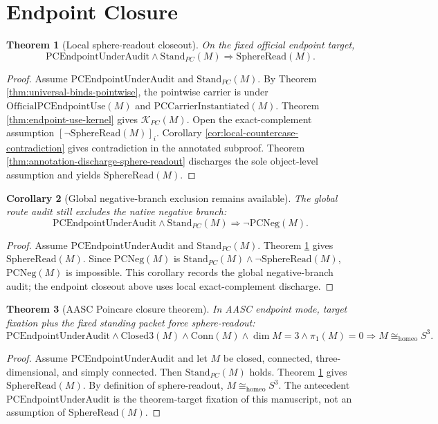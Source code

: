 \documentclass[11pt]{article}
\newtheorem{theorem}{Theorem}[section]
\newtheorem{corollary}[theorem]{Corollary}
\newcommand{\Sthree}{S^{3}}
\newcommand{\ClosedThree}{\mathrm{Closed3}}
\newcommand{\Conn}{\mathrm{Conn}}
\newcommand{\StandPC}{\mathrm{Stand}_{PC}}
\newcommand{\SphereRead}{\mathrm{SphereRead}}
\newcommand{\KPC}{\mathcal{K}_{PC}}
\newcommand{\PCEndpoint}{\mathrm{PCEndpointUnderAudit}}
\newcommand{\OfficialPCEndpointUse}{\mathrm{OfficialPCEndpointUse}}
\newcommand{\PCCarrierInst}{\mathrm{PCCarrierInstantiated}}
\newcommand{\PCNeg}{\mathrm{PCNeg}}
\newcommand{\Homeo}{\cong_{\mathrm{homeo}}}
\begin{document}
\section{Endpoint Closure}\label{sec:main}

\begin{theorem}[Local sphere-readout closeout]\label{thm:local-sphere-readout-closeout}
On the fixed official endpoint target,
\[
\PCEndpoint\wedge\StandPC(M)\Rightarrow \SphereRead(M).
\]
\end{theorem}
\begin{proof}
Assume \(\PCEndpoint\) and \(\StandPC(M)\). By Theorem \ref{thm:universal-binds-pointwise}, the pointwise carrier is under \(\OfficialPCEndpointUse(M)\) and \(\PCCarrierInst(M)\). Theorem \ref{thm:endpoint-use-kernel} gives \(\KPC(M)\). Open the exact-complement assumption \([\neg\SphereRead(M)]_i\). Corollary \ref{cor:local-countercase-contradiction} gives contradiction in the annotated subproof. Theorem \ref{thm:annotation-discharge-sphere-readout} discharges the sole object-level assumption and yields \(\SphereRead(M)\).
\end{proof}

\begin{corollary}[Global negative-branch exclusion remains available]\label{cor:global-negative-branch-exclusion}
The global route audit still excludes the native negative branch:
\[
\PCEndpoint\wedge\StandPC(M)\Rightarrow \neg\PCNeg(M).
\]
\end{corollary}
\begin{proof}
Assume \(\PCEndpoint\) and \(\StandPC(M)\). Theorem \ref{thm:local-sphere-readout-closeout} gives \(\SphereRead(M)\). Since \(\PCNeg(M)\) is \(\StandPC(M)\wedge\neg\SphereRead(M)\), \(\PCNeg(M)\) is impossible. This corollary records the global negative-branch audit; the endpoint closeout above uses local exact-complement discharge.
\end{proof}

\begin{theorem}[AASC Poincare closure theorem]\label{thm:aasc-poincare}
In AASC endpoint mode, target fixation plus the fixed standing packet force sphere-readout:
\[
\PCEndpoint\wedge\ClosedThree(M)\wedge\Conn(M)\wedge\dim M=3\wedge\pi_1(M)=0\Rightarrow M\Homeo\Sthree.
\]
\end{theorem}
\begin{proof}
Assume \(\PCEndpoint\) and let \(M\) be closed, connected, three-dimensional, and simply connected. Then \(\StandPC(M)\) holds. Theorem \ref{thm:local-sphere-readout-closeout} gives \(\SphereRead(M)\). By definition of sphere-readout, \(M\Homeo\Sthree\). The antecedent \(\PCEndpoint\) is the theorem-target fixation of this manuscript, not an assumption of \(\SphereRead(M)\).
\end{proof}
\end{document}

